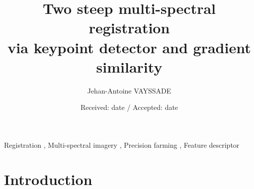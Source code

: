 \documentclass[]{elsarticle}
\begin{document}
	\begin{keyword}
		Registration \sep
		Multi-spectral imagery \sep
		Precision farming \sep
		Feature descriptor
	\end{keyword}
	
	\begin{frontmatter}
		\title{Two steep multi-spectral registration \\ via keypoint detector and gradient similarity}
		\author[unilu]{Jehan-Antoine VAYSSADE} 
		\address[myuni]{Agrosup D2A2E pole GestAd equipe agriculture de precision 21000 Dijon, France}
		\date{Received: date / Accepted: date}
	\end{frontmatter}
	
	\newpage
	\twocolumn
	
	\section{Introduction}
	
\end{document}
